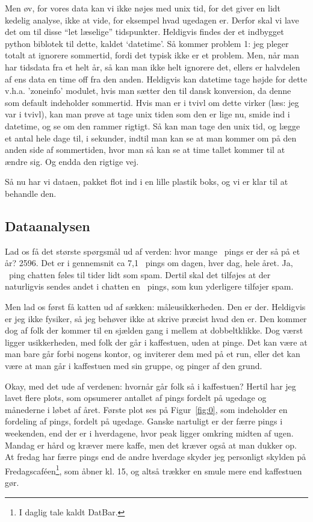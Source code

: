 \begin{article}
Men øv, for vores data kan vi ikke nøjes med unix tid, for det giver en lidt kedelig analyse, ikke at vide, for eksempel hvad ugedagen er. Derfor skal vi lave det om til disse ``let læselige'' tidspunkter. Heldigvis findes der et indbygget python biblotek til dette, kaldet `datetime'. Så kommer problem 1: jeg pleger totalt at ignorere sommertid, fordi det typisk ikke er et problem. Men, når man har tidsdata fra et helt år, så kan man ikke helt ignorere det, ellers er halvdelen af ens data en time off fra den anden. Heldigvis kan datetime tage højde for dette v.h.a. 'zoneinfo' modulet, hvis man sætter den til dansk konversion, da denne som default indeholder sommertid. Hvis man er i tvivl om dette virker (læs: jeg var i tvivl), kan man prøve at tage unix tiden som den er lige nu, smide ind i datetime, og se om den rammer rigtigt. Så kan man tage den unix tid, og lægge et antal hele dage til, i sekunder, indtil man kan se at man kommer om på den anden side af sommertiden, hvor man så kan se at time tallet kommer til at ændre sig. Og endda den rigtige vej.

Så nu har vi dataen, pakket flot ind i en lille plastik boks, og vi er klar til at behandle den.


\subsection*{Dataanalysen}

Lad os få det største spørgsmål ud af verden: hvor mange \coffee\ pings er der så på et år? 2596. Det er i gennemsnit ca 7,1 \coffee\ pings om dagen, hver dag, hele året. Ja, \coffee\ ping chatten føles til tider lidt som spam. Dertil skal det tilføjes at der naturligvis sendes andet i chatten en \coffee\ pings, som kun yderligere tilføjer spam.

Men lad os først få katten ud af sækken: måleusikkerheden. Den er der. Heldigvis er jeg ikke fysiker, så jeg behøver ikke at skrive præcist hvad den er. Den kommer dog af folk der kommer til en sjælden gang i mellem at dobbeltklikke. Dog værst ligger usikkerheden, med folk der går i kaffestuen, uden at pinge. Det kan være at man bare går forbi nogens kontor, og inviterer dem med på et run, eller det kan være at man går i kaffestuen med sin gruppe, og pinger af den grund.

Okay, med det ude af verdenen: hvornår går folk så i kaffestuen? Hertil har jeg lavet flere plots, som opsumerer antallet af pings fordelt på ugedage og månederne i løbet af året.
Første plot ses på Figur~\ref{fig:0}, som indeholder en fordeling af pings, fordelt på ugedage. Ganske nartuligt er der færre pings i weekenden, end der er i hverdagene, hvor peak ligger omkring midten af ugen. Mandag er hård og kræver mere kaffe, men det kræver også at man dukker op. At fredag har færre pings end de andre hverdage skyder jeg personligt skylden på Fredagscaféen\footnote{I daglig tale kaldt DatBar.}, som åbner kl. 15, og altså trækker en smule mere end kaffestuen gør.


\end{article}
